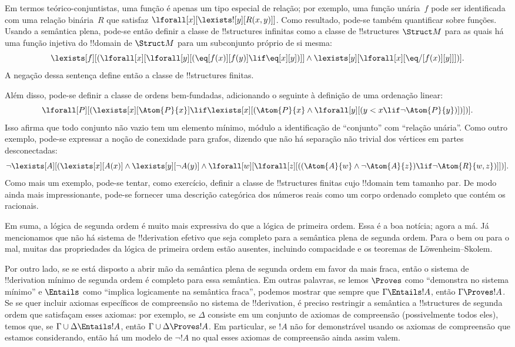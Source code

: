 \documentclass[../../../include/open-logic-section]{subfiles}
\begin{document}
Em termos teórico-conjuntistas, uma função é apenas um tipo especial de relação;
por exemplo, uma função unária~$f$ pode ser identificada com uma relação
binária~$R$ que satisfaz $\lforall[x][\lexists![y][R(x,y)]]$. Como resultado, pode-se
também quantificar sobre funções. Usando a semântica plena, pode-se
então definir a classe de !!{structure}s infinitas como a classe de
!!{structure}s $\Struct M$ para as quais há uma função injetiva do
!!{domain} de $\Struct M$ para um subconjunto próprio de si mesma:
\[
\lexists[f][(\lforall[x][\lforall[y][(\eq[f(x)][f(y)] \lif \eq[x][y])]]
  \land \lexists[y][\lforall[x][\eq/[f(x)][y]]])].
\]
A negação dessa sentença define então a classe de !!{structure}s
finitas.

Além disso, pode-se definir a classe de ordens bem-fundadas, adicionando o
seguinte à definição de uma ordenação linear:
\[
\lforall[P][(\lexists[x][\Atom{P}{x}] \lif \lexists[x][(\Atom{P}{x}
    \land \lforall[y][(y < x \lif \lnot \Atom{P}{y})])])].
\]
Isso afirma que todo conjunto não vazio tem um elemento mínimo, módulo a
identificação de ``conjunto'' com ``relação unária''. Como outro
exemplo, pode-se expressar a noção de conexidade para grafos, dizendo
que não há separação não trivial dos vértices em partes desconectadas:
\[
\lnot \lexists[A][(\lexists[x][A(x)] \land \lexists[y][\lnot A(y)]
  \land \lforall[w][\lforall[z][((\Atom{A}{w} \land \lnot \Atom{A}{z})
      \lif \lnot \Atom{R}{w,z})]])].
\]
Como mais um exemplo, pode-se tentar, como exercício, definir a
classe de !!{structure}s finitas cujo !!{domain} tem tamanho par. De
modo ainda mais impressionante, pode-se fornecer uma descrição categórica dos números
reais como um corpo ordenado completo que contém os racionais.

Em suma, a lógica de segunda ordem é muito mais expressiva do que a lógica de primeira ordem.
Essa é a boa notícia; agora a má. Já
mencionamos que não há sistema de !!{derivation} efetivo que seja completo para
a semântica plena de segunda ordem. Para o bem ou para o mal, muitas das
propriedades da lógica de primeira ordem estão ausentes, incluindo compacidade e
os teoremas de L\"owenheim--Skolem.

Por outro lado, se se está disposto a abrir mão da semântica plena de segunda ordem
em favor da mais fraca, então o sistema de !!{derivation} mínimo de segunda ordem
é completo para essa semântica. Em outras palavras, se
lemos $\Proves$ como ``demonstra no sistema mínimo'' e $\Entails$ como
``implica logicamente na semântica fraca'', podemos mostrar que
sempre que $\Gamma \Entails !A$, então $\Gamma \Proves !A$. Se se quer
incluir axiomas específicos de compreensão no sistema de !!{derivation}, é preciso
restringir a semântica a !!{structure}s de segunda ordem que satisfaçam
esses axiomas: por exemplo, se $\Delta$ consiste em um conjunto de
axiomas de compreensão (possivelmente todos eles), temos que, se $\Gamma
\cup \Delta \Entails !A$, então $\Gamma \cup \Delta \Proves !A$. Em
particular, se $!A$ não for demonstrável usando os axiomas de compreensão que
estamos considerando, então há um modelo de $\lnot !A$ no qual esses
axiomas de compreensão ainda assim valem.
\end{document}
